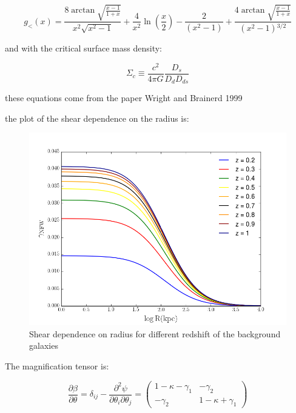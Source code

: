 \begin{equation}
g_{<}(x)=\frac{8 \arctan \sqrt{\frac{x-1}{1+x}}}{x^{2}\sqrt{x^{2}-1}}+\frac{4}{x^{2}}\ln \left(\frac{x}{2}\right)-\frac{2}{\left(x^{2}-1\right)}+\frac{4 \arctan \sqrt{\frac{x-1}{1+x}}}{\left(x^{2}-1\right){}^{3/2}}
\end{equation} 

and with the critical surface mass density:

\begin{equation}
\Sigma_{c}\equiv\frac{c^{2}}{4\pi G}\frac{D_{s}}{D_{d}D_{ds}}
\end{equation}

these equations come from the paper Wright and Brainerd 1999

the plot of the shear dependence on the radius is:

\begin{figure}[H]
\centering
\includegraphics[width=12cm]{images/Shear_vs_rad.png}
\caption[Shear dependence on radius]{Shear dependence on radius for different redshift of the background galaxies}
\end{figure}

The magnification tensor is:

\begin{equation}
\frac{\partial\beta}{\partial\theta}=\delta_{ij}-\frac{\partial^{2}\psi}{\partial\theta_{i}\partial\theta_{j}}=\left(\begin{array}{cc}
1-\kappa-\gamma_{1} & -\gamma_{2}\\
-\gamma_{2} & 1-\kappa+\gamma_{1}
\end{array}\right)
\end{equation}

